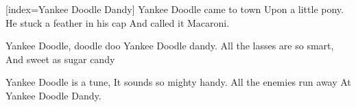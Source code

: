 [index={Yankee Doodle Dandy}]
\beginverse
Yankee Doodle came to town
Upon a little pony.
He stuck a feather in his cap
And called it Macaroni.
\endverse

\beginchorus
Yankee Doodle, doodle doo
Yankee Doodle dandy.
All the lasses are so smart,
And sweet as sugar candy
\endchorus

\beginverse
Yankee Doodle is a tune,
It sounds so mighty handy.
All the enemies run away
At Yankee Doodle Dandy.
\endverse

\endsong